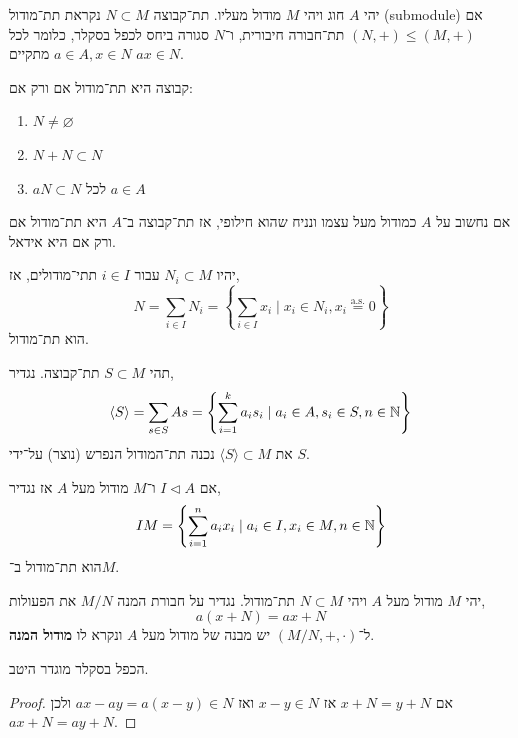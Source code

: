 \begin{definition}[תת־מודול]
	יהי $A$ חוג ויהי $M$ מודול מעליו.
	תת־קבוצה $N \subset M$ נקראת תת־מודול (submodule) אם $(N, +) \le (M, +)$ תת־חבורה חיבורית, ו־$N$ סגורה ביחס לכפל בסקלר, כלומר לכל $a \in A, x \in N$ מתקיים $a x \in N$.
\end{definition}
\begin{proposition}
	קבוצה היא תת־מודול אם ורק אם:
	\begin{enumerate}
		\item $N \ne \varnothing$
		\item $N + N \subset N$
		\item $a N \subset N$ לכל $a \in A$
	\end{enumerate}
\end{proposition}
\begin{example}
	אם נחשוב על $A$ כמודול מעל עצמו ונניח שהוא חילופי, אז תת־קבוצה ב־$A$ היא תת־מודול אם ורק אם היא אידאל.
\end{example}
\begin{proposition}
	יהיו $N_i \subset M$ עבור $i \in I$ תתי־מודולים, אז,
	\[
		N
		= \sum_{i \in I} N_i
		= \left\{ \sum_{i \in I} x_i \mid x_i \in N_i, x_i \overset{\text{a.s.}}{=} 0 \right\}
	\]
	הוא תת־מודול.
\end{proposition}
\begin{definition}
	תהי $S \subset M$ תת־קבוצה.
	נגדיר,
	\[
		\langle S \rangle
		= \sum_{s \in S} A s
		= \left\{ \sum_{i = 1}^k a_i s_i \mid a_i \in A, s_i \in S, n \in \mathbb{N} \right\}
	\]
	את $\langle S \rangle \subset M$ נכנה תת־המודול הנפרש (נוצר) על־ידי $S$.
\end{definition}
\begin{definition}
	אם $I \triangleleft A$ ו־$M$ מודול מעל $A$ אז נגדיר,
	\[
		I M
		= \left\{ \sum_{i = 1}^n a_i x_i \mid a_i \in I, x_i \in M, n \in \mathbb{N} \right\}
	\]
	הוא תת־מודול ב־$M$.
\end{definition}
\begin{definition}
	יהי $M$ מודול מעל $A$ ויהי $N \subset M$ תת־מודול.
	נגדיר על חבורת המנה $M / N$ את הפעולות,
	\[
		a (x + N)
		= a x + N
	\]
	ל־$(M / N, +, \cdot)$ יש מבנה של מודול מעל $A$ ונקרא לו \textbf{מודול המנה}.
\end{definition}
\begin{proposition}
	הכפל בסקלר מוגדר היטב.
\end{proposition}
\begin{proof}
	אם $x + N = y + N$ אז $x - y \in N$ ואז $a x - a y = a (x - y) \in N$ ולכן $a x + N = a y + N$.
\end{proof}

